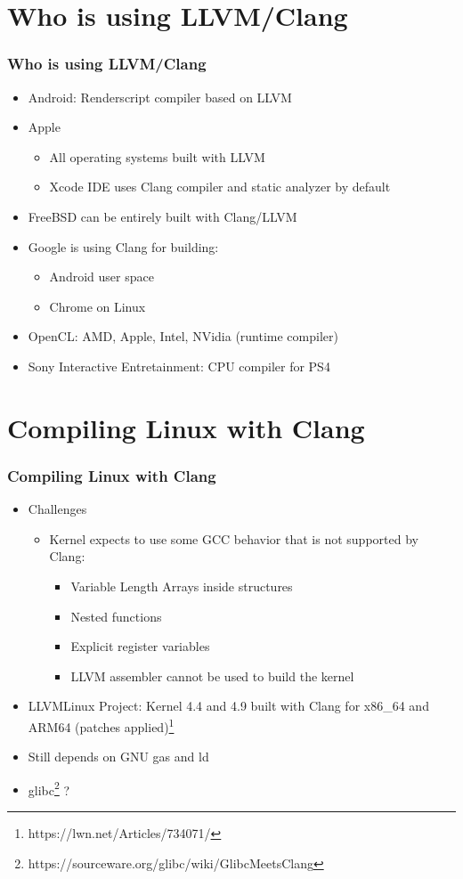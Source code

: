 \documentclass{beamer}
\begin{document}
\section{Who is using LLVM/Clang}

\begin{frame}
\frametitle{Who is using LLVM/Clang}
\begin{itemize}
  \item Android: Renderscript compiler based on LLVM
  \item Apple
  \begin{itemize}
    \item All operating systems built with LLVM
    \item Xcode IDE uses Clang compiler and static analyzer by default
  \end{itemize}
  \item FreeBSD can be entirely built with Clang/LLVM
  \item Google is using Clang for building:
  \begin{itemize}
    \item Android user space
    \item Chrome on Linux
  \end{itemize}
  \item OpenCL: AMD, Apple, Intel, NVidia (runtime compiler)
  \item Sony Interactive Entretainment: CPU compiler for PS4
\end{itemize}
\end{frame}
\section{Compiling Linux with Clang}

\begin{frame}
\frametitle{Compiling Linux with Clang}
\begin{itemize}
  \item Challenges
  \begin{itemize}
    \item Kernel expects to use some GCC behavior that is not supported by Clang:
    \begin{itemize}
      \item Variable Length Arrays inside structures
      \item Nested functions
      \item Explicit register variables
      \item LLVM assembler cannot be used to build the kernel
    \end{itemize}
  \end{itemize}
  \item LLVMLinux Project: Kernel 4.4 and 4.9 built with Clang for x86\_64 and ARM64
  (patches applied)\footnote{https://lwn.net/Articles/734071/}
  \item Still depends on GNU {\selectfont gas} and {\selectfont ld}
  \item glibc\footnote{https://sourceware.org/glibc/wiki/GlibcMeetsClang} ?
\end{itemize}
\end{frame}
\end{document}
